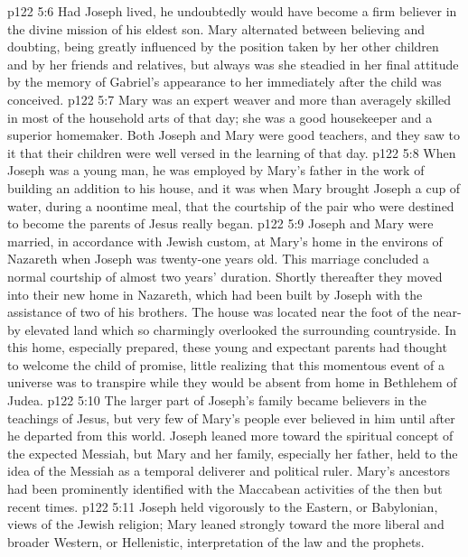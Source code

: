 \vs p122 5:6 Had Joseph lived, he undoubtedly would have become a firm believer in the divine mission of his eldest son. Mary alternated between believing and doubting, being greatly influenced by the position taken by her other children and by her friends and relatives, but always was she steadied in her final attitude by the memory of Gabriel’s appearance to her immediately after the child was conceived.
\vs p122 5:7 Mary was an expert weaver and more than averagely skilled in most of the household arts of that day; she was a good housekeeper and a superior homemaker. Both Joseph and Mary were good teachers, and they saw to it that their children were well versed in the learning of that day.
\pc \vs p122 5:8 When Joseph was a young man, he was employed by Mary’s father in the work of building an addition to his house, and it was when Mary brought Joseph a cup of water, during a noontime meal, that the courtship of the pair who were destined to become the parents of Jesus really began.
\vs p122 5:9 Joseph and Mary were married, in accordance with Jewish custom, at Mary’s home in the environs of Nazareth when Joseph was twenty\hyp{}one years old. This marriage concluded a normal courtship of almost two years’ duration. Shortly thereafter they moved into their new home in Nazareth, which had been built by Joseph with the assistance of two of his brothers. The house was located near the foot of the near\hyp{}by elevated land which so charmingly overlooked the surrounding countryside. In this home, especially prepared, these young and expectant parents had thought to welcome the child of promise, little realizing that this momentous event of a universe was to transpire while they would be absent from home in Bethlehem of Judea.
\pc \vs p122 5:10 The larger part of Joseph’s family became believers in the teachings of Jesus, but very few of Mary’s people ever believed in him until after he departed from this world. Joseph leaned more toward the spiritual concept of the expected Messiah, but Mary and her family, especially her father, held to the idea of the Messiah as a temporal deliverer and political ruler. Mary’s ancestors had been prominently identified with the Maccabean activities of the then but recent times.
\vs p122 5:11 Joseph held vigorously to the Eastern, or Babylonian, views of the Jewish religion; Mary leaned strongly toward the more liberal and broader Western, or Hellenistic, interpretation of the law and the prophets.

